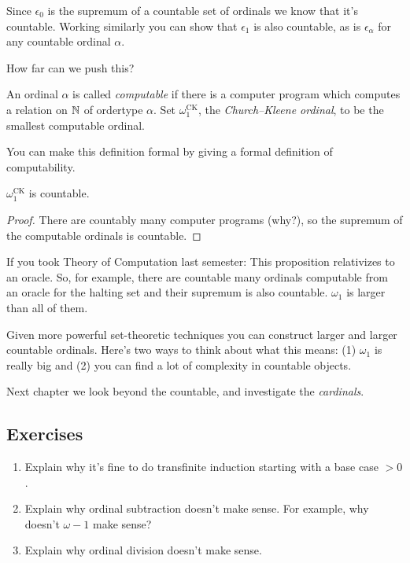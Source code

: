 \documentclass[10pt]{amsart}
\begin{document}
Since $\epsilon_0$ is the supremum of a countable set of ordinals we know that it's countable. Working similarly you can show that $\epsilon_1$ is also countable, as is $\epsilon_\alpha$ for any countable ordinal $\alpha$.

How far can we push this? 

\begin{definition}[Informal]
An ordinal $\alpha$ is called \emph{computable} if there is a computer program which computes a relation on $\mathbb{N}$ of ordertype $\alpha$. Set $\omega_1^{\mathrm{CK}}$, the \emph{Church--Kleene ordinal}, to be the smallest computable ordinal.
\end{definition}

You can make this definition formal by giving a formal definition of computability. 

\begin{proposition}
$\omega_1^{\mathrm{CK}}$ is countable.
\end{proposition}

\begin{proof}
There are countably many computer programs (why?), so the supremum of the computable ordinals is countable.
\end{proof}

If you took Theory of Computation last semester: This proposition relativizes to an oracle. So, for example, there are countable many ordinals computable from an oracle for the halting set and their supremum is also countable. $\omega_1$ is larger than all of them.

Given more powerful set-theoretic techniques you can construct larger and larger countable ordinals. Here's two ways to think about what this means: (1) $\omega_1$ is really big and (2) you can find a lot of complexity in countable objects.

Next chapter we look beyond the countable, and investigate the \emph{cardinals}.


\subsection*{Exercises}

\begin{enumerate}
\item Explain why it's fine to do transfinite induction starting with a base case $>0$. 
\item Explain why ordinal subtraction doesn't make sense. For example, why doesn't $\omega - 1$ make sense?
\item Explain why ordinal division doesn't make sense.
\end{enumerate}
\end{document}

